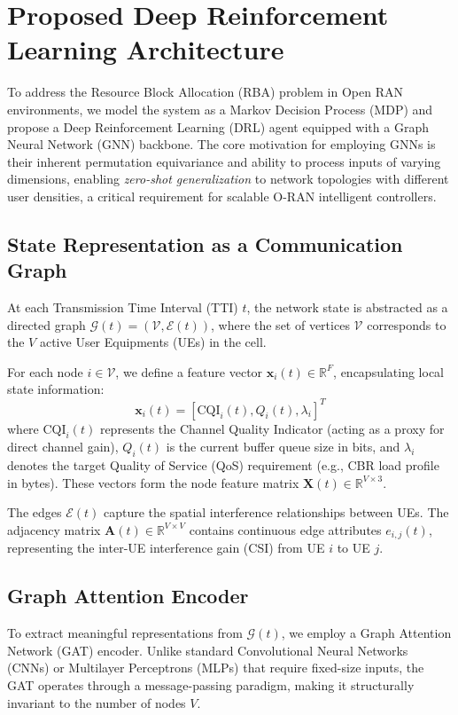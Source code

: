 \section{Proposed Deep Reinforcement Learning Architecture}
\label{sec:proposed_architecture}

To address the Resource Block Allocation (RBA) problem in Open RAN environments, we model the system as a Markov Decision Process (MDP) and propose a Deep Reinforcement Learning (DRL) agent equipped with a Graph Neural Network (GNN) backbone. The core motivation for employing GNNs is their inherent permutation equivariance and ability to process inputs of varying dimensions, enabling \textit{zero-shot generalization} to network topologies with different user densities, a critical requirement for scalable O-RAN intelligent controllers.

\subsection{State Representation as a Communication Graph}
At each Transmission Time Interval (TTI) $t$, the network state is abstracted as a directed graph $\mathcal{G}(t) = (\mathcal{V}, \mathcal{E}(t))$, where the set of vertices $\mathcal{V}$ corresponds to the $V$ active User Equipments (UEs) in the cell.

For each node $i \in \mathcal{V}$, we define a feature vector $\mathbf{x}_i(t) \in \mathbb{R}^{F}$, encapsulating local state information:
\begin{equation}
    \mathbf{x}_i(t) = \left[ \text{CQI}_i(t), Q_i(t), \lambda_i \right]^T
\end{equation}
where $\text{CQI}_i(t)$ represents the Channel Quality Indicator (acting as a proxy for direct channel gain), $Q_i(t)$ is the current buffer queue size in bits, and $\lambda_i$ denotes the target Quality of Service (QoS) requirement (e.g., CBR load profile in bytes). These vectors form the node feature matrix $\mathbf{X}(t) \in \mathbb{R}^{V \times 3}$.

The edges $\mathcal{E}(t)$ capture the spatial interference relationships between UEs. The adjacency matrix $\mathbf{A}(t) \in \mathbb{R}^{V \times V}$ contains continuous edge attributes $e_{i,j}(t)$, representing the inter-UE interference gain (CSI) from UE $i$ to UE $j$.

\subsection{Graph Attention Encoder}
To extract meaningful representations from $\mathcal{G}(t)$, we employ a Graph Attention Network (GAT) encoder. Unlike standard Convolutional Neural Networks (CNNs) or Multilayer Perceptrons (MLPs) that require fixed-size inputs, the GAT operates through a message-passing paradigm, making it structurally invariant to the number of nodes $V$.

